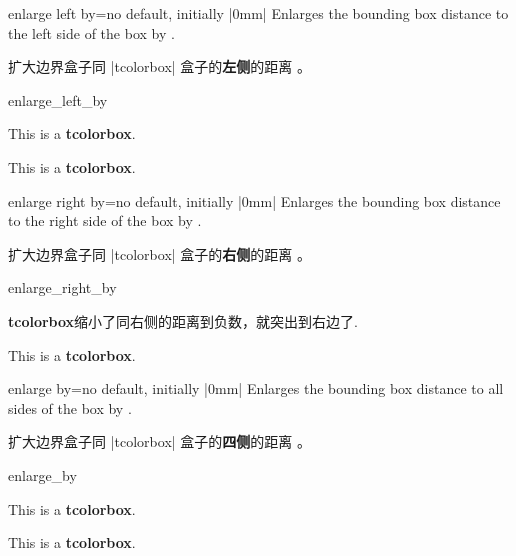 \begin{docTcbKey}{enlarge left by}{=}{no default, initially |0mm|}
Enlarges the bounding box distance to the left side of the box by .

扩大边界盒子同 |tcolorbox| 盒子的{\bf 左侧}的距离 。
\begin{exdispExample}[safety=2cm]{enlarge_left_by}

\begin{tcolorbox}[enlarge left by=2cm,width=5cm,enhanced,show bounding box]
This is a \textbf{tcolorbox}.
\end{tcolorbox}
\begin{tcolorbox}[enlarge left by=-2cm,width=\linewidth+2cm]
This is a \textbf{tcolorbox}.
\end{tcolorbox}
\end{exdispExample}
\end{docTcbKey}

\begin{docTcbKey}{enlarge right by}{=}{no default, initially |0mm|}
Enlarges the bounding box distance to the right side of the box by .

扩大边界盒子同 |tcolorbox| 盒子的{\bf 右侧}的距离 。
\begin{exdispExample}[safety=2cm]{enlarge_right_by}

\begin{tcolorbox}[enlarge right by=-2cm,width=\linewidth+2cm,
enhanced,show bounding box]
\textbf{tcolorbox}缩小了同右侧的距离到负数，就突出到右边了.
\end{tcolorbox}
\begin{tcolorbox}[enlarge right by=2cm,width=\linewidth-2cm]
This is a \textbf{tcolorbox}.
\end{tcolorbox}
\end{exdispExample}
\end{docTcbKey}




\begin{docTcbKey}{enlarge by}{=}{no default, initially |0mm|}
Enlarges the bounding box distance to all sides of the box by .

扩大边界盒子同 |tcolorbox| 盒子的{\bf 四侧}的距离 。
\begin{exdispExample}{enlarge_by}

\begin{tcolorbox}
This is a \textbf{tcolorbox}.
\end{tcolorbox}
\begin{tcolorbox}[enlarge by=5mm,enhanced,show bounding box]
This is a \textbf{tcolorbox}.
\end{tcolorbox}
\end{exdispExample}
\end{docTcbKey}





